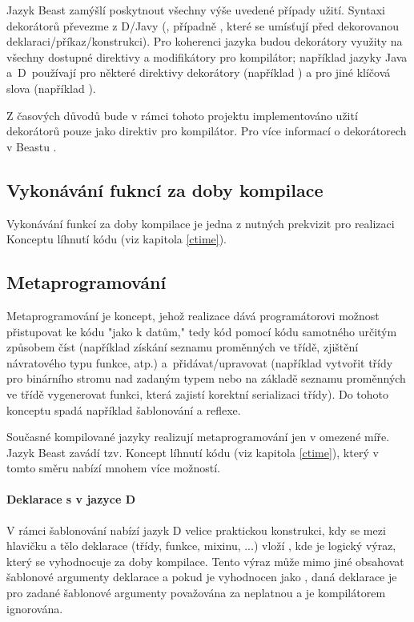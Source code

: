 Jazyk Beast zamýšlí poskytnout všechny výše uvedené případy užití. Syntaxi dekorátorů převezme z D/Javy (, případně , které se umísťují před dekorovanou deklaraci/příkaz/konstrukci). Pro koherenci jazyka budou dekorátory využity na všechny dostupné direktivy a modifikátory pro kompilátor; například jazyky Java a~D~používají pro některé direktivy dekorátory (například ) a pro jiné klíčová slova (například ).

Z časových důvodů bude v rámci tohoto projektu implementováno užití dekorátorů pouze jako direktiv pro kompilátor. Pro více informací o dekorátorech v Beastu .

\subsection{Vykonávání fukncí za doby kompilace}
Vykonávání funkcí za doby kompilace je jedna z nutných prekvizit pro realizaci Konceptu líhnutí kódu (viz kapitola \ref{ctime}).

\subsection{Metaprogramování} \label{metaprogramming}
Metaprogramování je koncept, jehož realizace dává programátorovi možnost přistupovat ke kódu "jako k datům," tedy kód pomocí kódu samotného určitým způsobem číst (například získání seznamu proměnných ve třídě, zjištění návratového typu funkce, atp.) a~přidávat/upravovat (například vytvořit třídy pro binárního stromu nad zadaným typem nebo na základě seznamu proměnných ve třídě vygenerovat funkci, která zajistí korektní serializaci třídy). Do tohoto konceptu spadá například šablonování a reflexe.

Současné kompilované jazyky realizují metaprogramování jen v omezené míře. Jazyk Beast zavádí tzv. Koncept líhnutí kódu (viz kapitola \ref{ctime}), který v tomto směru nabízí mnohem více možností.

\paragraph{Deklarace s  v jazyce D}
V rámci šablonování nabízí jazyk D velice praktickou konstrukci, kdy se mezi hlavičku a tělo deklarace (třídy, funkce, mixinu, ...) vloží , kde  je logický výraz, který se vyhodnocuje za doby kompilace. Tento výraz může mimo jiné obsahovat šablonové argumenty deklarace a pokud je vyhodnocen jako , daná deklarace je pro zadané šablonové argumenty považována za neplatnou a je kompilátorem ignorována.

